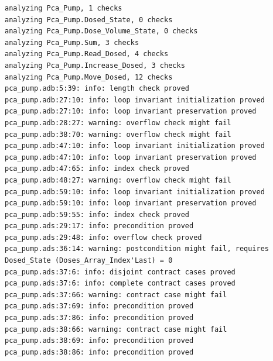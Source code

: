 \singlespacing
\begin{lstlisting}[frame=single, gobble=0, caption={GNATprove verification summary of module for dose monitoring in SPARK 2014}, label={listing:pca_pump_move_dosed_unit_spark2014_gnatprove}]
analyzing Pca_Pump, 1 checks
analyzing Pca_Pump.Dosed_State, 0 checks
analyzing Pca_Pump.Dose_Volume_State, 0 checks
analyzing Pca_Pump.Sum, 3 checks
analyzing Pca_Pump.Read_Dosed, 4 checks
analyzing Pca_Pump.Increase_Dosed, 3 checks
analyzing Pca_Pump.Move_Dosed, 12 checks
pca_pump.adb:5:39: info: length check proved
pca_pump.adb:27:10: info: loop invariant initialization proved
pca_pump.adb:27:10: info: loop invariant preservation proved
pca_pump.adb:28:27: warning: overflow check might fail
pca_pump.adb:38:70: warning: overflow check might fail
pca_pump.adb:47:10: info: loop invariant initialization proved
pca_pump.adb:47:10: info: loop invariant preservation proved
pca_pump.adb:47:65: info: index check proved
pca_pump.adb:48:27: warning: overflow check might fail
pca_pump.adb:59:10: info: loop invariant initialization proved
pca_pump.adb:59:10: info: loop invariant preservation proved
pca_pump.adb:59:55: info: index check proved
pca_pump.ads:29:17: info: precondition proved
pca_pump.ads:29:48: info: overflow check proved
pca_pump.ads:36:14: warning: postcondition might fail, requires Dosed_State (Doses_Array_Index'Last) = 0
pca_pump.ads:37:6: info: disjoint contract cases proved
pca_pump.ads:37:6: info: complete contract cases proved
pca_pump.ads:37:66: warning: contract case might fail
pca_pump.ads:37:69: info: precondition proved
pca_pump.ads:37:86: info: precondition proved
pca_pump.ads:38:66: warning: contract case might fail
pca_pump.ads:38:69: info: precondition proved
pca_pump.ads:38:86: info: precondition proved
\end{lstlisting}
\doublespacing


